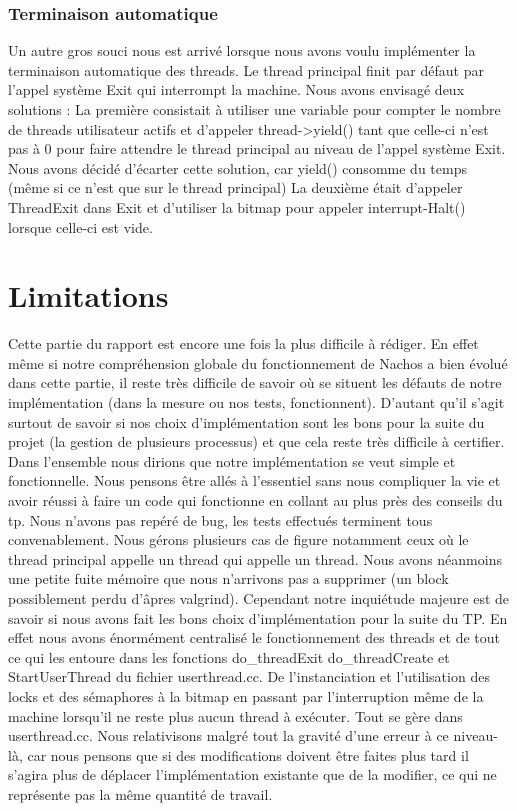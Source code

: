 \documentclass[10pt]{article}
\begin{document}
\subsubsection{Terminaison automatique}
Un autre gros souci nous est arrivé lorsque nous avons voulu implémenter la terminaison
automatique des threads. Le thread principal finit par défaut par l'appel système Exit
qui interrompt la machine.
Nous avons envisagé deux solutions :
La première consistait à utiliser une variable pour compter le nombre de threads utilisateur actifs
et d'appeler thread->yield() tant que celle-ci n'est pas à 0 pour faire attendre le thread principal
au niveau de l'appel système Exit. Nous avons décidé d'écarter cette solution, car yield()
consomme du temps (même si ce n'est que sur le thread principal)
La deuxième était d'appeler ThreadExit dans Exit et d'utiliser la bitmap pour appeler interrupt-Halt()
lorsque celle-ci est vide.


\section{Limitations}

Cette partie du rapport est encore une fois la plus difficile à rédiger. En effet
même si notre compréhension globale du fonctionnement de Nachos a bien évolué dans
cette partie, il reste très difficile de savoir où se situent les défauts de notre
implémentation (dans la mesure ou nos tests, fonctionnent). D'autant qu'il s'agit surtout
de savoir si nos choix d'implémentation sont les bons pour la suite du projet (la gestion
de plusieurs processus) et que cela reste très difficile à certifier.
\newline
\newline
Dans l'ensemble nous dirions que notre implémentation se veut simple et fonctionnelle.
Nous pensons être allés à l'essentiel sans nous compliquer la vie et avoir réussi à faire
un code qui fonctionne en collant au plus près des conseils du tp.
Nous n'avons pas repéré de bug, les tests effectués terminent tous convenablement. Nous gérons plusieurs
cas de figure notamment ceux où le thread principal appelle un thread qui appelle un thread.
\newline
\newline
Nous avons néanmoins une petite fuite mémoire que nous n'arrivons pas a
supprimer (un block possiblement perdu d'âpres valgrind).
Cependant notre inquiétude majeure est de savoir si nous avons fait les bons choix d'implémentation
pour la suite du TP. En effet nous avons énormément centralisé le fonctionnement des
threads et de tout ce qui les entoure dans les fonctions do\_threadExit
do\_threadCreate et StartUserThread du fichier userthread.cc.
De l'instanciation et l'utilisation des locks et des sémaphores à la bitmap en passant par
l'interruption même de la machine lorsqu'il ne reste plus aucun thread à exécuter. Tout
se gère dans userthread.cc.
Nous relativisons malgré tout la gravité d'une erreur à ce niveau-là, car nous pensons que si
des modifications doivent être faites plus tard il s'agira plus de déplacer l'implémentation existante que de
la modifier, ce qui ne représente pas la même quantité de travail.
\end{document}
